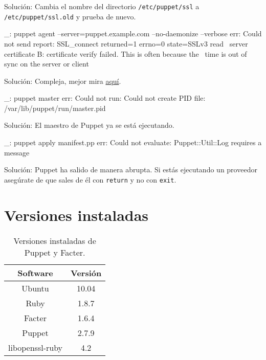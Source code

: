 Solución: Cambia el nombre del directorio \texttt{/etc/puppet/ssl} a \texttt{/etc/puppet/ssl.old} y prueba de nuevo.

\begin{bashcode}
_: puppet agent --server=puppet.example.com --no-daemonize --verbose
err: Could not send report: SSL_connect returned=1 errno=0 state=SSLv3 read \
server certificate B: certificate verify failed. This is often because the \
time is out of sync on the server or client
\end{bashcode}

Solución: Compleja, mejor mira \href{http://projects.puppetlabs.com/projects/1/wiki/Certificates_And_Security}{aquí}.

\begin{bashcode}
_: puppet master
err: Could not run: Could not create PID file: /var/lib/puppet/run/master.pid
\end{bashcode}

Solución: El maestro de Puppet ya se está ejecutando.

\begin{bashcode}
_: puppet apply manifest.pp
err: Could not evaluate: Puppet::Util::Log requires a message
\end{bashcode}

Solución: Puppet ha salido de manera abrupta. Si estás ejecutando un proveedor asegúrate de que sales de él con \texttt{return} y no con \texttt{exit}.


\section{Versiones instaladas}

\begin{table}[!htbp]
\centering
   \begin{tabular}{|c|c|}
      \hline
      \textbf{Software} & \textbf{Versión} \\ \hline
      Ubuntu & 10.04 \\ \hline
      Ruby   & 1.8.7 \\ \hline
      Facter & 1.6.4 \\ \hline
      Puppet & 2.7.9 \\ \hline
      libopenssl-ruby &	4.2 \\ \hline
   \end{tabular}
\caption{Versiones instaladas de Puppet y Facter.}
\label{table:puppet-versions}
\end{table}
